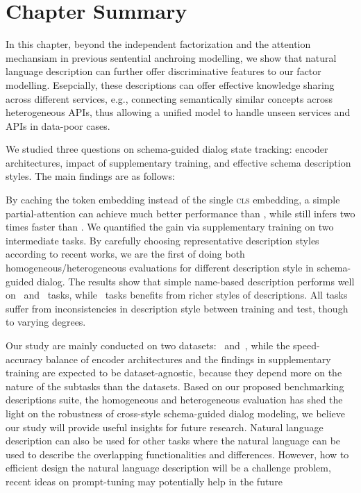\section{Chapter Summary}
\label{sec:conclusion}
In this chapter, beyond the independent factorization and the
attention mechansiam in previous sentential anchroing modelling, we
show that natural language description can further offer
discriminative features to our factor modelling. Esepcially, these
descriptions can offer effective knowledge sharing across different
services, e.g., connecting semantically similar concepts across
heterogeneous APIs, thus allowing a unified model to handle unseen
services and APIs in data-poor cases.

We studied three questions on schema-guided dialog state tracking:
encoder architectures, impact of supplementary training, and effective
schema description styles.  The main findings are as follows:

By caching the token embedding instead of the single \textsc{cls}
embedding, a simple partial-attention \FE can achieve much better
performance than \DE, while still infers two times faster than \CE.
We quantified the gain via supplementary training on two intermediate
tasks.  By carefully choosing representative description styles
according to recent works, we are the first of doing both
homogeneous/heterogeneous evaluations for different description style
in schema-guided dialog. The results show that simple name-based
description performs well on \IC~and \RSI~tasks, while \NSL~tasks
benefits from richer styles of descriptions.  All tasks suffer from
inconsistencies in description style between training and test, though
to varying degrees.

Our study are mainly conducted on two datasets: \sgdst~and~\multiwoz,
while the speed-accuracy balance of encoder architectures and the
findings in supplementary training are expected to be
dataset-agnostic, because they depend more on the nature of the
subtasks than the datasets. Based on our proposed benchmarking
descriptions suite, the homogeneous and heterogeneous evaluation has
shed the light on the robustness of cross-style schema-guided dialog
modeling, we believe our study will provide useful insights for future
research. Natural language description can also be used for other
tasks where the natural language can be used to describe the
overlapping functionalities and differences. However, how to efficient
design the natural language description will be a challenge problem,
recent ideas on prompt-tuning may potentially help in the
future~\citep{schucher2022power,ye2022ontology}



